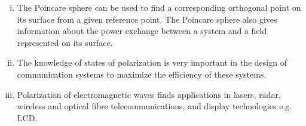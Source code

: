 \begin{enumerate}[(i)]
\item The Poincare sphere can be used to find a corresponding orthogonal point on its surface from a given reference point. The Poincare sphere also gives information about the power exchange between a system and a field represented on its surface.

\item The knowledge of states of polarization is very important in the design of communication systems to maximize the efficiency of these systems. 

\item  Polarization of electromagnetic waves finds applications in lasers, radar, wireless and optical fibre telecommunications, and display technologies e.g. LCD.
\end{enumerate}
